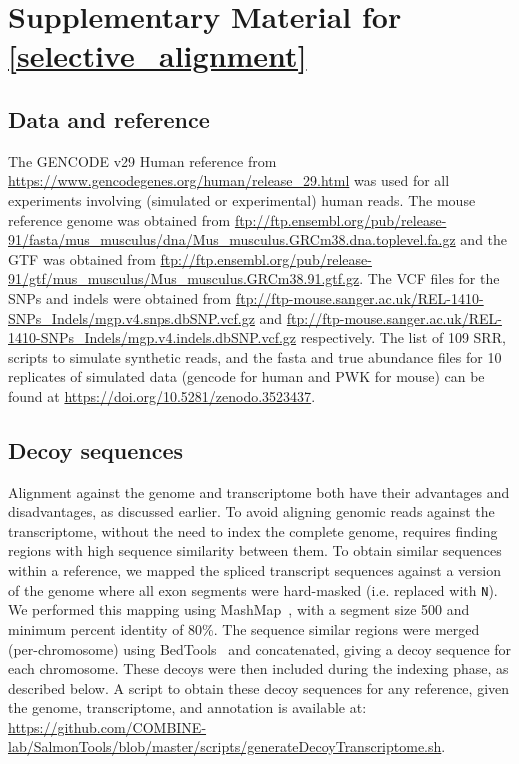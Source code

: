 
\chapter{Supplementary Material for \cref{selective_alignment}} %
\label{appendix-selal}

\section{Data and reference}
\label{subsec:meth_accessions}

The GENCODE v29 Human reference from
\url{https://www.gencodegenes.org/human/release_29.html} was used for all
experiments involving (simulated or experimental) human reads. The mouse
reference genome was obtained from
\url{ftp://ftp.ensembl.org/pub/release-91/fasta/mus_musculus/dna/Mus_musculus.GRCm38.dna.toplevel.fa.gz}
and the GTF was obtained from
\url{ftp://ftp.ensembl.org/pub/release-91/gtf/mus_musculus/Mus_musculus.GRCm38.91.gtf.gz}.
The VCF files for the SNPs and indels were obtained from
\url{ftp://ftp-mouse.sanger.ac.uk/REL-1410-SNPs_Indels/mgp.v4.snps.dbSNP.vcf.gz}
and
\url{ftp://ftp-mouse.sanger.ac.uk/REL-1410-SNPs_Indels/mgp.v4.indels.dbSNP.vcf.gz}
respectively. The list of 109 SRR, scripts to simulate synthetic reads, and the fasta
and true abundance files for 10 replicates of simulated data (gencode for human
and PWK for mouse) can be found at
\url{https://doi.org/10.5281/zenodo.3523437}.

\section{Decoy sequences}
\label{subsec:meth_decoy}

Alignment against the genome and transcriptome both have their advantages and
disadvantages, as discussed earlier. To avoid aligning genomic reads against
the transcriptome, without the need to index the complete genome, requires
finding regions with high sequence similarity between them. To obtain similar
sequences within a reference, we mapped the spliced transcript sequences against
a version of the genome where all exon segments were hard-masked (i.e.\@
replaced with \texttt{N}). We performed this mapping using
MashMap~\citep{jain2018fast}, with a segment size 500 and minimum percent
identity of 80\%. The sequence similar regions were merged (per-chromosome)
using BedTools~\citep{quinlan2010bedtools} and concatenated, giving a decoy
sequence for each chromosome. These decoys were then included during the
\salmon indexing phase, as described below. A script to obtain these decoy
sequences for any reference, given the genome, transcriptome, and annotation
is available at: \url{https://github.com/COMBINE-lab/SalmonTools/blob/master/scripts/generateDecoyTranscriptome.sh}.

